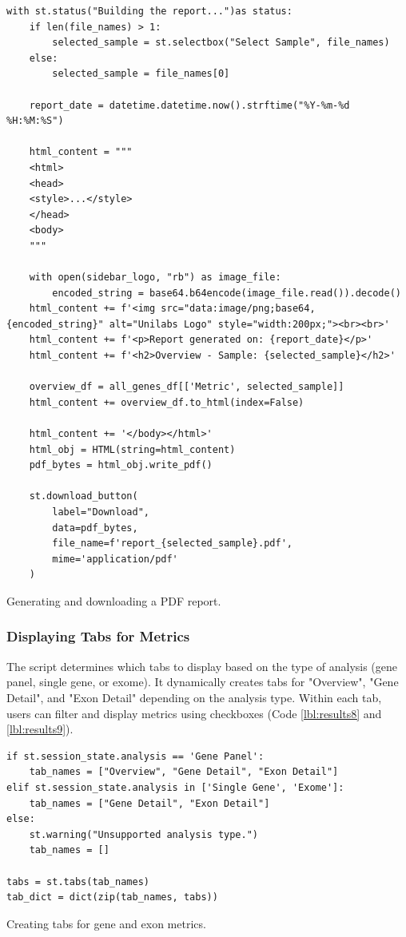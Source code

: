\begin{longlisting}
\begin{verbatim}
with st.status("Building the report...")as status:
    if len(file_names) > 1:
        selected_sample = st.selectbox("Select Sample", file_names)
    else:
        selected_sample = file_names[0]
    
    report_date = datetime.datetime.now().strftime("%Y-%m-%d %H:%M:%S")
    
    html_content = """
    <html>
    <head>
    <style>...</style>
    </head>
    <body>
    """
    
    with open(sidebar_logo, "rb") as image_file:
        encoded_string = base64.b64encode(image_file.read()).decode()
    html_content += f'<img src="data:image/png;base64,{encoded_string}" alt="Unilabs Logo" style="width:200px;"><br><br>'
    html_content += f'<p>Report generated on: {report_date}</p>'
    html_content += f'<h2>Overview - Sample: {selected_sample}</h2>'
    
    overview_df = all_genes_df[['Metric', selected_sample]]
    html_content += overview_df.to_html(index=False)
    
    html_content += '</body></html>'
    html_obj = HTML(string=html_content)
    pdf_bytes = html_obj.write_pdf()

    st.download_button(
        label="Download",
        data=pdf_bytes,
        file_name=f'report_{selected_sample}.pdf',
        mime='application/pdf'
    )
\end{verbatim}
\caption{Generating and downloading a PDF report.}
\label{lbl:results7}
\end{longlisting}

\subsubsection{\textbf{Displaying Tabs for Metrics}}

The script determines which tabs to display based on the type of analysis (gene panel, single gene, or exome). It dynamically creates tabs for "Overview", "Gene Detail", and "Exon Detail" depending on the analysis type. Within each tab, users can filter and display metrics using checkboxes (Code \ref{lbl:results8} and \ref{lbl:results9}).

\begin{longlisting}
\begin{verbatim}
if st.session_state.analysis == 'Gene Panel':
    tab_names = ["Overview", "Gene Detail", "Exon Detail"]
elif st.session_state.analysis in ['Single Gene', 'Exome']:
    tab_names = ["Gene Detail", "Exon Detail"]
else:
    st.warning("Unsupported analysis type.")
    tab_names = []

tabs = st.tabs(tab_names)
tab_dict = dict(zip(tab_names, tabs))
\end{verbatim}
\caption{Creating tabs for gene and exon metrics.}
\label{lbl:results8}
\end{longlisting}

